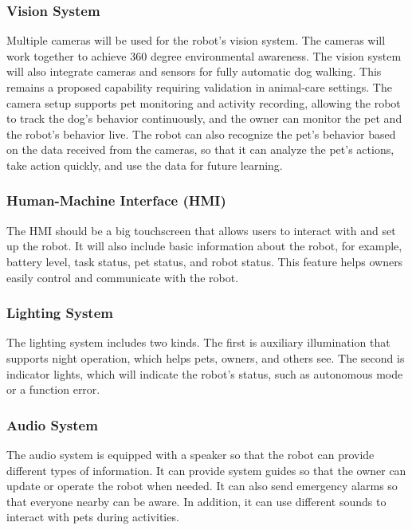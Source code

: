 \documentclass[conference,letterpaper]{IEEEtran}
\begin{document}
\subsubsection{Vision System}

Multiple cameras will be used for the robot’s vision system. The cameras will work together to achieve 360 degree environmental awareness. The vision system will also integrate cameras and sensors for fully automatic dog walking. This remains a proposed capability requiring validation in animal-care settings. The camera setup supports pet monitoring and activity recording, allowing the robot to track the dog’s behavior continuously, and the owner can monitor the pet and the robot’s behavior live. The robot can also recognize the pet’s behavior based on the data received from the cameras, so that it can analyze the pet’s actions, take action quickly, and use the data for future learning.

\subsubsection{Human-Machine Interface (HMI)}

The HMI should be a big touchscreen that allows users to interact with and set up the robot. It will also include basic information about the robot, for example, battery level, task status, pet status, and robot status. This feature helps owners easily control and communicate with the robot.

\subsubsection{Lighting System}

The lighting system includes two kinds. The first is auxiliary illumination that supports night operation, which helps pets, owners, and others see. The second is indicator lights, which will indicate the robot's status, such as autonomous mode or a function error.

\subsubsection{Audio System}

The audio system is equipped with a speaker so that the robot can provide different types of information. It can provide system guides so that the owner can update or operate the robot when needed. It can also send emergency alarms so that everyone nearby can be aware. In addition, it can use different sounds to interact with pets during activities.
\end{document}
